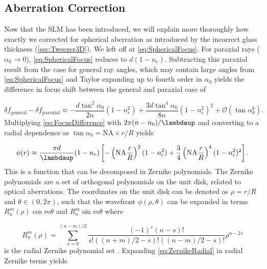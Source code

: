 \subsection{Aberration Correction}\label{subsec:AberrationCorrection}

Now that the SLM has been introduced, we will explain more thoroughly how exactly we corrected for spherical aberration as introduced by the incorrect glass thickness (\cref{sec:Tweezer3D}).
We left off at \cref{eq:SphericalFocus}.
For paraxial rays ($\alpha_0 \rightarrow 0$), \cref{eq:SphericalFocus} reduces to $d(1-n_r)$. 
Subtracting this paraxial result from the case for general ray angles, which may contain large angles from \cref{eq:SphericalFocus} and Taylor expanding up to fourth order in $\alpha_0$ yields the difference in focus shift between the general and paraxial case of \cite{Iwaniuk2011}

\begin{equation}\label{eq:FocusDifference}
    \delta f_{\text{general}} - \delta f_{\text{paraxial}} \approx
    -\frac{d \tan^2{\alpha_0}}{2n} (1-n_r^2) 
    +\frac{3d \tan^4{\alpha_0}}{8n}(1-n_r^2)^2+\mathcal{O}(\tan\alpha_0^6).
\end{equation}
Multiplying \cref{eq:FocusDifference} with $2\pi(n-n_0)/\lambdaup$ and converting to a radial dependence as $\tan{\alpha_0}= \text{NA} \times r/R$ yields 

\begin{equation}\label{eq:ConversionRadial}
    \phi(r) \approx \frac{\pi d}{\lambdaup}(1-n_r)\left[
    -\left(\text{NA}\frac{r}{R}\right)^2(1-n_r^2)+\frac{3}{4}\left(\text{NA}\frac{r}{ R}\right)^4(1-n_r^2)^2
    \right].
\end{equation}
This is a function that can be decomposed in Zernike polynomials.
The Zernike polynomials are a set of orthogonal polynomials on the unit disk, related to optical aberrations. 
The coordinates on the unit disk can be denoted as $\rho = r/R$ and $\theta \in (0, 2\pi)$, such that the wavefront $\phi(\rho,\theta)$ can be expanded in terms $R_n^m(\rho)\cos{m\theta}$ and $R_n^m\sin{m\theta}$ where 

\begin{equation}\label{eq:ZernikeRadial}
    R_{n}^{m}(\rho)=
    \sum_{s=0}^{(n-m) / 2}
    \frac{(-1)^{s}(n-s) !}{s !\left((n+m)/2-s\right) !\left((n-m)/2-s\right) !} \rho^{n-2 s}
\end{equation}
is the radial Zernike polynomial set \cite{Mahajan94}. 
Expanding \cref{eq:ZernikeRadial} in radial Zernike terms yields

